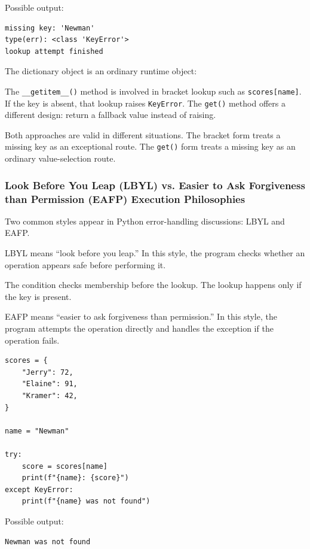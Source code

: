 Possible output:

\begin{verbatim}
missing key: 'Newman'
type(err): <class 'KeyError'>
lookup attempt finished
\end{verbatim}

The dictionary object is an ordinary runtime object:

The \texttt{\_\_getitem\_\_()} method is involved in bracket lookup such as \texttt{scores[name]}. If the key is absent, that lookup raises \texttt{KeyError}. The \texttt{get()} method offers a different design: return a fallback value instead of raising.

Both approaches are valid in different situations. The bracket form treats a missing key as an exceptional route. The \texttt{get()} form treats a missing key as an ordinary value-selection route.

\subsubsection{Look Before You Leap (LBYL) vs. Easier to Ask Forgiveness than Permission (EAFP) Execution Philosophies}

Two common styles appear in Python error-handling discussions: LBYL and EAFP.

LBYL means ``look before you leap.'' In this style, the program checks whether an operation appears safe before performing it.

The condition checks membership before the lookup. The lookup happens only if the key is present.

EAFP means ``easier to ask forgiveness than permission.'' In this style, the program attempts the operation directly and handles the exception if the operation fails.

\begin{verbatim}
scores = {
    "Jerry": 72,
    "Elaine": 91,
    "Kramer": 42,
}

name = "Newman"

try:
    score = scores[name]
    print(f"{name}: {score}")
except KeyError:
    print(f"{name} was not found")
\end{verbatim}

Possible output:

\begin{verbatim}
Newman was not found
\end{verbatim}

